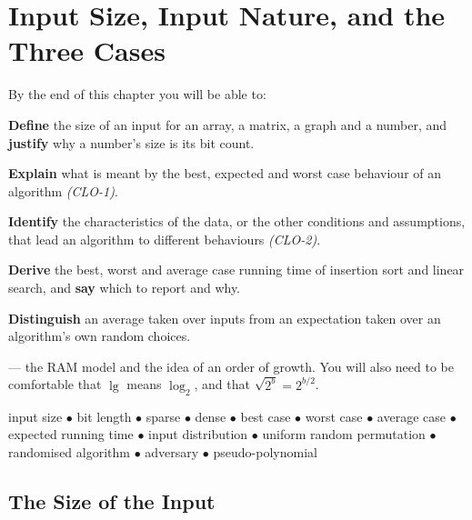 \chapter{Input Size, Input Nature, and the Three Cases}\label{ch:cases}

\begin{outcomes}
By the end of this chapter you will be able to:
\begin{tight}
  \item \textbf{Define} the size of an input for an array, a matrix, a graph
        and a number, and \textbf{justify} why a number's size is its bit
        count.
  \item \textbf{Explain} what is meant by the best, expected and worst case
        behaviour of an algorithm \emph{(CLO-1)}.
  \item \textbf{Identify} the characteristics of the data, or the other
        conditions and assumptions, that lead an algorithm to different
        behaviours \emph{(CLO-2)}.
  \item \textbf{Derive} the best, worst and average case running time of
        insertion sort and linear search, and \textbf{say} which to report and
        why.
  \item \textbf{Distinguish} an average taken over inputs from an expectation
        taken over an algorithm's own random choices.
\end{tight}
\end{outcomes}

\begin{prereq}
 --- the RAM model and the idea of an order of growth. You will
also need to be comfortable that $\lg$ means $\log_{2}$, and that
$\sqrt{2^{b}} = 2^{b/2}$.
\end{prereq}

\begin{keyterms}
input size $\bullet$ bit length $\bullet$ sparse $\bullet$ dense $\bullet$
best case $\bullet$ worst case $\bullet$ average case $\bullet$ expected
running time $\bullet$ input distribution $\bullet$ uniform random permutation
$\bullet$ randomised algorithm $\bullet$ adversary $\bullet$
pseudo-polynomial
\end{keyterms}

\section{The Size of the Input}


